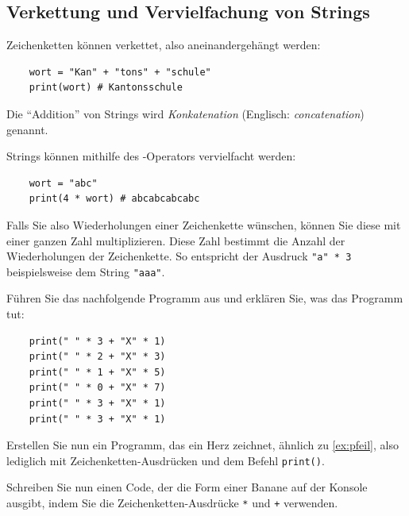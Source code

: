 \subsection{Verkettung und Vervielfachung von Strings}
Zeichenketten können verkettet, also aneinandergehängt werden:
\begin{lstlisting}
    wort = "Kan" + "tons" + "schule"
    print(wort) # Kantonsschule
\end{lstlisting}
Die \enquote{Addition} von Strings wird \textit{Konkatenation} (Englisch: \textit{concatenation}) genannt.

Strings können mithilfe des \pythoninline{*}-Operators vervielfacht werden:
\begin{lstlisting}
    wort = "abc"
    print(4 * wort) # abcabcabcabc
\end{lstlisting}
Falls Sie also Wiederholungen einer Zeichenkette wünschen, können Sie diese mit einer ganzen Zahl multiplizieren. Diese Zahl bestimmt die Anzahl der Wiederholungen der Zeichenkette. So entspricht der Ausdruck \lstinline|"a" * 3| beispielsweise dem String \lstinline|"aaa"|.

\begin{myexercise}\label{ex:pfeil}
	Führen Sie das nachfolgende Programm aus und erklären Sie, was das Programm tut:
	\begin{lstlisting}
    print(" " * 3 + "X" * 1)
    print(" " * 2 + "X" * 3)
    print(" " * 1 + "X" * 5)
    print(" " * 0 + "X" * 7)
    print(" " * 3 + "X" * 1)
    print(" " * 3 + "X" * 1)
  \end{lstlisting}
\end{myexercise}

\begin{mysubmission}\label{ex:herz}
	Erstellen Sie nun ein Programm, das ein Herz zeichnet, ähnlich zu \cref{ex:pfeil}, also lediglich mit Zeichenketten-Ausdrücken und dem Befehl \lstinline|print()|.
	\begin{myanswer}
		
	\end{myanswer}
\end{mysubmission}

\begin{mychallenge}
	Schreiben Sie nun einen Code, der die Form einer Banane auf der Konsole ausgibt, indem Sie die Zeichenketten-Ausdrücke \lstinline|*| und \lstinline|+| verwenden.
	\begin{myanswer}
		
	\end{myanswer}
\end{mychallenge}


